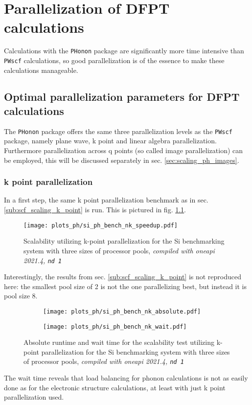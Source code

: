 \documentclass[main.tex]{subfiles}
\begin{document}
\chapter{Parallelization of DFPT calculations}\label{ch:optimization_ph}

Calculations with the \texttt{PHonon} package are significantly more time intensive than \texttt{PWscf} calculations, so good parallelization is of the essence to make these calculations manageable.

\section{Optimal parallelization parameters for DFPT calculations}

The \texttt{PHonon} package offers the same three parallelization levels as the \texttt{PWscf} package, namely plane wave, k point and linear algebra parallelization.
Furthermore parallelization across q points (so called image parallelization) can be employed, this will be discussed separately in sec. \ref{sec:scaling_ph_images}.

\subsection{k point parallelization}

In a first step, the same k point parallelization benchmark as in sec. \ref{sub:scf_scaling_k_point} is run. This is pictured in fig. \ref{fig:scaling_ph_nk_si}.

\begin{figure}[htb!]
    \centering
    \texttt{[image: plots\_ph/si\_ph\_bench\_nk\_speedup.pdf]}
    \caption{Scalability utilizing k-point parallelization for the Si benchmarking system with three sizes of processor pools, \emph{\QE compiled with \gls{oneapi} 2021.4, \texttt{nd 1}}}
    \label{fig:scaling_ph_nk_si}
\end{figure}
Interestingly, the results from sec. \ref{sub:scf_scaling_k_point} is not reproduced here: the smallest pool size of 2 is not the one parallelizing best, but instead it is pool size 8.

\begin{figure}[ht!]
    \begin{subfigure}[b]{0.49\textwidth}
        \centering
        \texttt{[image: plots\_ph/si\_ph\_bench\_nk\_absolute.pdf]}
    \end{subfigure}
    \begin{subfigure}[b]{0.49\textwidth}
        \centering
        \texttt{[image: plots\_ph/si\_ph\_bench\_nk\_wait.pdf]}
    \end{subfigure}
    \caption{Absolute runtime and wait time for the scalability test utilizing k-point parallelization for the Si benchmarking system with three sizes of processor pools, \emph{\QE compiled with \gls{oneapi} 2021.4, \texttt{nd 1}}}
    \label{fig:scaling_ph_nk_si_absolute_wait}
\end{figure}
The wait time reveals that load balancing for phonon calculations is not as easily done as for the electronic structure calculations, at least with just k point parallelization used.
\end{document}
